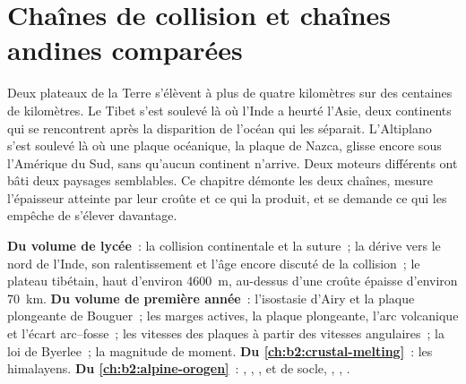 \chapter{Chaînes de collision et chaînes andines comparées}\label{ch:b2:himalaya-andes}

Deux plateaux de la Terre s'élèvent à plus de quatre kilomètres sur des centaines de kilomètres. Le
Tibet s'est soulevé là où l'Inde a heurté l'Asie, deux continents qui se rencontrent après la disparition
de l'océan qui les séparait. L'Altiplano s'est soulevé là où une plaque océanique, la plaque
de Nazca, glisse encore sous l'Amérique du Sud, sans qu'aucun continent n'arrive. Deux moteurs différents
ont bâti deux paysages semblables. Ce chapitre démonte les deux chaînes, mesure l'épaisseur
atteinte par leur croûte et ce qui la produit, et se demande ce qui les empêche de s'élever davantage.

\begin{recall}
\textbf{Du volume de lycée}~: la collision continentale et la suture~; la dérive vers le nord de l'Inde,
son ralentissement et l'âge encore discuté de la collision~; le plateau tibétain, haut d'environ
\qty{4600}{m}, au-dessus d'une croûte épaisse d'environ \qty{70}{km}. \textbf{Du volume de première année}~:
l'isostasie d'Airy et la plaque plongeante de Bouguer~; les marges actives, la plaque plongeante,
l'arc volcanique et l'écart arc--fosse~; les vitesses des plaques à partir des vitesses angulaires~; la
loi de Byerlee~; la magnitude de moment. \textbf{Du \cref{ch:b2:crustal-melting}}~: les 
himalayens. \textbf{Du \cref{ch:b2:alpine-orogen}}~: , , ,  et de socle, , , .
\end{recall}

